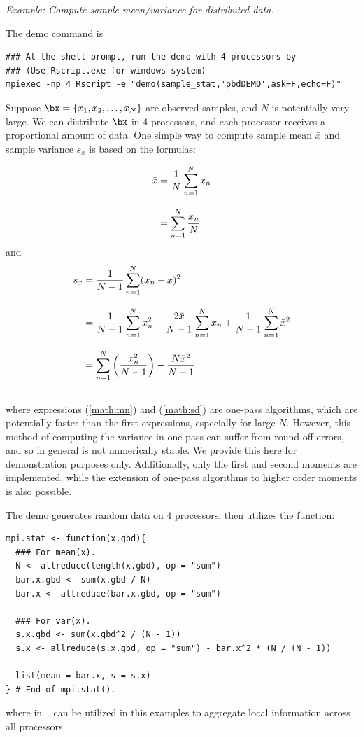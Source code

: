 \emph{Example:  Compute sample mean/variance for distributed data.}

The demo command is
\begin{lstlisting}
### At the shell prompt, run the demo with 4 processors by
### (Use Rscript.exe for windows system)
mpiexec -np 4 Rscript -e "demo(sample_stat,'pbdDEMO',ask=F,echo=F)"
\end{lstlisting}

Suppose $\bx = \{x_1, x_2, \ldots, x_N\}$
are observed samples, and $N$ is potentially very large.
We can distribute $\bx$ in 4 processors, and each processor receives a
proportional amount of data. One simple way to compute sample
mean $\bar{x}$ and
sample variance $s_x$ is based on the formulas:

\begin{align}
\bar{x} &= \frac{1}{N} \sum_{n = 1}^N x_n \notag \\[.3cm]
        &= \sum_{n = 1}^N \frac{x_n}{N} \label{math:mn}
\end{align}
and
\begin{align}
s_x     &= \frac{1}{N - 1} \sum_{n = 1}^N (x_n - \bar{x})^2 \notag \\[.3cm]
        &= \frac{1}{N - 1} \sum_{n = 1}^N x_n^2 - \frac{2\bar{x}}{N - 1}\sum_{n = 1}^N x_n +  \frac{1}{N - 1}\sum_{n = 1}^N\bar{x}^2 \notag \\[.3cm]
        &= \sum_{n = 1}^N \left(\frac{x^2_n}{N-1}\right) - \frac{N \bar{x}^2}{N-1} \label{math:sd}\\\notag
\end{align}
where expressions (\ref{math:mn}) and (\ref{math:sd}) are one-pass algorithms,
which are potentially faster than the first expressions,
especially for large $N$. However, this method of computing the variance in
one pass can suffer from round-off errors, and so in general is not
numerically stable. We provide this here for demonstration purposes only.
Additionally, only the first and second moments are implemented, while
the extension of one-pass algorithms to higher order moments is also
possible.

The demo generates random data on 4 processors, then
utilizes the  function:
\begin{lstlisting}[language=rr,title=R Code]
mpi.stat <- function(x.gbd){ 
  ### For mean(x).
  N <- allreduce(length(x.gbd), op = "sum")
  bar.x.gbd <- sum(x.gbd / N)
  bar.x <- allreduce(bar.x.gbd, op = "sum")

  ### For var(x).
  s.x.gbd <- sum(x.gbd^2 / (N - 1))
  s.x <- allreduce(s.x.gbd, op = "sum") - bar.x^2 * (N / (N - 1))

  list(mean = bar.x, s = s.x)
} # End of mpi.stat().
\end{lstlisting}
where 
in ~\citep{Chen2012pbdMPIpackage} can
be utilized in this examples to aggregate local information across
all processors.






